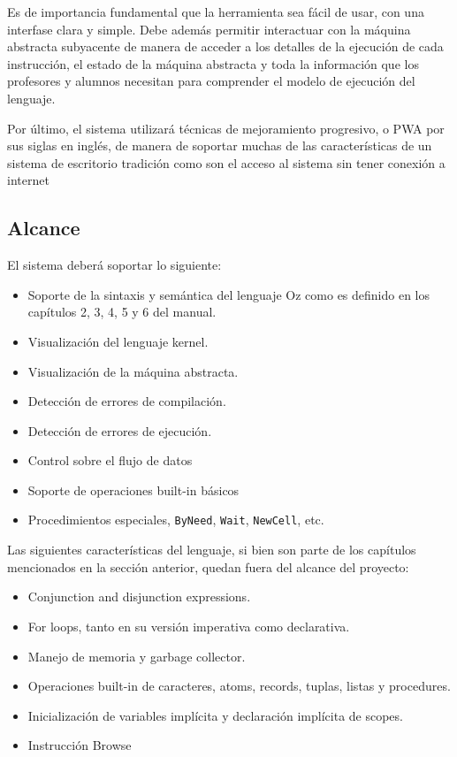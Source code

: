 \documentclass[a4paper,11pt]{article}
\begin{document}
Es de importancia fundamental que la herramienta sea fácil de usar, con una interfase clara y simple. Debe además permitir interactuar con la máquina abstracta subyacente de manera de acceder a los detalles de la ejecución de cada instrucción, el estado de la máquina abstracta y toda la información que los profesores y alumnos necesitan para comprender el modelo de ejecución del lenguaje.

Por último, el sistema utilizará técnicas de mejoramiento progresivo, o PWA por sus siglas en inglés, de manera de soportar muchas de las características de un sistema de escritorio tradición como son el acceso al sistema sin tener conexión a internet

\subsection{Alcance}

El sistema deberá soportar lo siguiente:

\begin{itemize}
    \item Soporte de la sintaxis y semántica del lenguaje Oz como es definido en los capítulos 2, 3, 4, 5 y 6 del manual.
    \item Visualización del lenguaje kernel.
    \item Visualización de la máquina abstracta.
    \item Detección de errores de compilación.
    \item Detección de errores de ejecución.
    \item Control sobre el flujo de datos
    \item Soporte de operaciones built-in básicos
    \item Procedimientos especiales, \texttt{ByNeed}, \texttt{Wait}, \texttt{NewCell}, etc. 
\end{itemize}

Las siguientes características del lenguaje, si bien son parte de los capítulos mencionados en la sección anterior, quedan fuera del alcance del proyecto:

\begin{itemize}
    \item Conjunction and disjunction expressions.
    \item For loops, tanto en su versión imperativa como declarativa.
    \item Manejo de memoria y garbage collector.
    \item Operaciones built-in de caracteres, atoms, records, tuplas, listas y procedures.
    \item Inicialización de variables implícita y declaración implícita de scopes.
    \item Instrucción Browse
\end{itemize}
\end{document}
